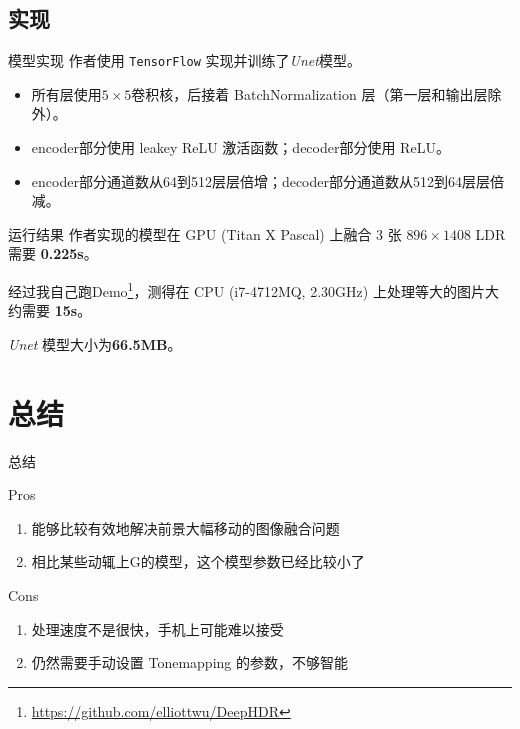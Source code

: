 \documentclass{beamer}
\begin{document}
    \subsection{实现}

    \begin{frame}{模型实现}
        作者使用 \texttt{TensorFlow} 实现并训练了\textit{Unet}模型。
        \begin{itemize}
            \item 所有层使用$5\times 5$卷积核，后接着 BatchNormalization 层（第一层和输出层除外）。
            \item encoder部分使用 leakey ReLU 激活函数；decoder部分使用 ReLU。
            \item encoder部分通道数从64到512层层倍增；decoder部分通道数从512到64层层倍减。
        \end{itemize}
    \end{frame}

    \begin{frame}{运行结果}
        作者实现的模型在 GPU (Titan X Pascal) 上融合 3 张 $896\times 1408$ LDR 需要 \textbf{0.225s}。
        
        经过我自己跑Demo\footnote{\url{https://github.com/elliottwu/DeepHDR}}，测得在 CPU 
        (i7-4712MQ, 2.30GHz) 上处理等大的图片大约需要 \textbf{15s}。

        \textit{Unet} 模型大小为\textbf{66.5MB}。
    \end{frame}

    \section{总结}

    \begin{frame}{总结}
        \begin{block}{Pros}
            \begin{enumerate}
                \pause
                \item 能够比较有效地解决前景大幅移动的图像融合问题
                \pause
                \item 相比某些动辄上G的模型，这个模型参数已经比较小了
            \end{enumerate}
        \end{block}

        \pause
        \vspace{1cm}
        \begin{block}{Cons}
            \begin{enumerate}
                \pause
                \item 处理速度不是很快，手机上可能难以接受
                \pause
                \item 仍然需要手动设置 Tonemapping 的参数，不够智能
            \end{enumerate}
        \end{block}
    \end{frame}
\end{document}

